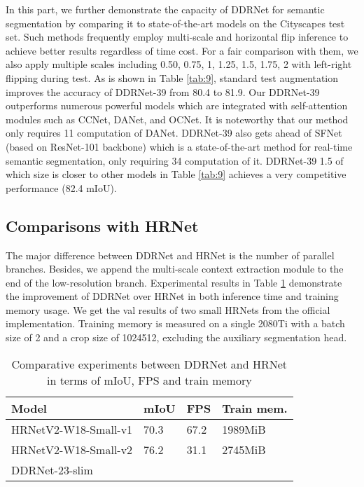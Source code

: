 \documentclass[journal]{IEEEtran}
\begin{document}
In this part, we further demonstrate the capacity of DDRNet for semantic segmentation by comparing it to state-of-the-art models on the Cityscapes test set. Such methods frequently employ multi-scale and horizontal flip inference to achieve better results regardless of time cost. For a fair comparison with them, we also apply multiple scales including 0.50, 0.75, 1, 1.25, 1.5, 1.75, 2 with left-right flipping during test. As is shown in Table \ref{tab:9}, standard test augmentation improves the accuracy of DDRNet-39 from 80.4 to 81.9. Our DDRNet-39 outperforms numerous powerful models which are integrated with self-attention modules such as CCNet, DANet, and OCNet. It is noteworthy that our method only requires 11 computation of DANet. DDRNet-39 also gets ahead of SFNet (based on ResNet-101 backbone) which is a state-of-the-art method for real-time semantic segmentation, only requiring 34 computation of it. DDRNet-39 1.5 of which size is closer to other models in Table \ref{tab:9} achieves a very competitive performance (82.4 mIoU).

\subsection{Comparisons with HRNet}

The major difference between DDRNet and HRNet is the number of parallel branches. Besides, we append the multi-scale context extraction module to the end of the low-resolution branch. Experimental results in Table \ref{tab:10} demonstrate the improvement of DDRNet over HRNet in both inference time and training memory usage. We get the val results of two small HRNets from the official implementation. Training memory is measured on a single 2080Ti with a batch size of 2 and a crop size of 1024512, excluding the auxiliary segmentation head.

\begin{table}[]
\caption{Comparative experiments between DDRNet and HRNet in terms of mIoU, FPS and train memory}
\label{tab:10}
\begin{tabular}{p{100pt}p{30pt}<{\centering}p{30pt}<{\centering}p{43pt}<{\centering}}
\toprule
Model                                & mIoU              & FPS               & Train mem.  \\ \midrule
HRNetV2-W18-Small-v1\cite{9052469}   & 70.3              & 67.2              & 1989MiB     \\
HRNetV2-W18-Small-v2\cite{9052469}   & 76.2              & 31.1              & 2745MiB     \\
DDRNet-23-slim                       &    &   &      \\ \bottomrule
\end{tabular}
\end{table}
\end{document}
